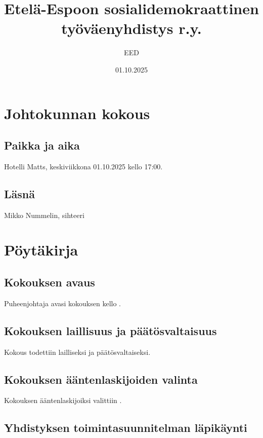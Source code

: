 \documentclass[a4paper,12pt]{article}
\title{Etelä-Espoon sosialidemokraattinen työväenyhdistys r.y.}
\author{EED}
\date{01.10.2025}
\begin{document}
\maketitle
\tableofcontents
\section*{Johtokunnan kokous}
\subsection*{Paikka ja aika}
Hotelli Matts, keskiviikkona 01.10.2025 kello 17:00.
\subsection*{Läsnä}
Mikko Nummelin, sihteeri
\section*{Pöytäkirja}
\subsection{Kokouksen avaus}
Puheenjohtaja avasi kokouksen kello .
\subsection{Kokouksen laillisuus ja päätösvaltaisuus}
Kokous todettiin lailliseksi ja päätösvaltaiseksi.
\subsection{Kokouksen ääntenlaskijoiden valinta}
Kokouksen ääntenlaskijoiksi valittiin .
\subsection{Yhdistyksen toimintasuunnitelman läpikäynti}
\end{document}
